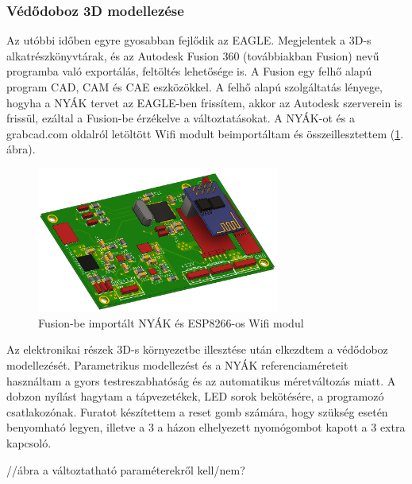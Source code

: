 \documentclass[../main.tex]{subfiles}
\begin{document}
        \subsubsection{Védődoboz 3D modellezése}
            Az utóbbi időben egyre gyosabban fejlődik az EAGLE. Megjelentek a 3D-s alkatrészkönyvtárak, és az Autodesk Fusion 360 (továbbiakban Fusion) nevű programba való exportálás, feltöltés lehetősége is. A Fusion egy felhő alapú program CAD, CAM és CAE eszközökkel. A felhő alapú szolgáltatás lényege, hogyha a NYÁK tervet az EAGLE-ben frissítem, akkor az Autodesk szerverein is frissül, ezáltal a Fusion-be érzékelve a változtatásokat.
            A NYÁK-ot és a grabcad.com oldalról letöltött Wifi modult beimportáltam és összeillesztettem (\ref{fig:fusion_pcb_esp8266}. ábra).
            
            \begin{figure}[h!]
                    \centering
                        \includegraphics[width=8cm]{resources/pcb_res/fusion_pcb_esp8266.png}
                    \caption{Fusion-be importált NYÁK és ESP8266-os Wifi modul}
                    \label{fig:fusion_pcb_esp8266}
            \end{figure}
            
            Az elektronikai részek 3D-s környezetbe illesztése után elkezdtem a védődoboz modellezését. Parametrikus modellezést és a NYÁK referenciaméreteit használtam a gyors testreszabhatóság és az automatikus méretváltozás miatt. A dobzon nyílást hagytam a tápvezetékek, LED sorok bekötésére, a programozó csatlakozónak. Furatot készítettem a reset gomb számára, hogy szükség esetén benyomható legyen, illetve a 3 a házon elhelyezett nyomógombot kapott a 3 extra kapcsoló.
            
            //ábra a változtatható paraméterekről kell/nem?
            
\end{document}
